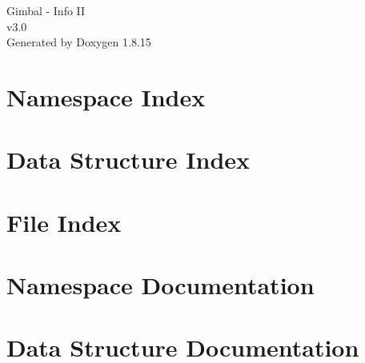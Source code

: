 \let\mypdfximage\pdfximage\def\pdfximage{\immediate\mypdfximage}\documentclass[twoside]{book}
\newcommand{\+}{\discretionary{\mbox{\scriptsize$\hookleftarrow$}}{}{}}
\newcommand{\clearemptydoublepage}{%
  \newpage{\pagestyle{empty}\cleardoublepage}%
}
\begin{document}
\hypersetup{pageanchor=false,
             bookmarksnumbered=true,
             pdfencoding=unicode
            }
\begin{titlepage}
\vspace*{7cm}
\begin{center}%
{\Large Gimbal -\/ Info II \\[1ex]\large v3.\+0 }\\
\vspace*{1cm}
{\large Generated by Doxygen 1.8.15}\\
\end{center}
\end{titlepage}
\clearemptydoublepage
{}
\tableofcontents
\clearemptydoublepage
{}
\hypersetup{pageanchor=true}

\chapter{Namespace Index}

\chapter{Data Structure Index}

\chapter{File Index}

\chapter{Namespace Documentation}

\chapter{Data Structure Documentation}








\end{document}
